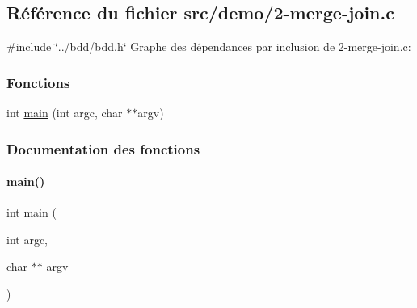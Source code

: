 \hypertarget{2-merge-join_8c}{}\subsection{Référence du fichier src/demo/2-\/merge-\/join.c}
\label{2-merge-join_8c}
{\ttfamily \#include \char`\"{}../bdd/bdd.\+h\char`\"{}}\newline
Graphe des dépendances par inclusion de 2-\/merge-\/join.c\+:
\subsubsection*{Fonctions}
\begin{DoxyCompactItemize}
\item 
int \hyperlink{2-merge-join_8c_a3c04138a5bfe5d72780bb7e82a18e627}{main} (int argc, char $\ast$$\ast$argv)
\end{DoxyCompactItemize}


\subsubsection{Documentation des fonctions}
\mbox{\label{2-merge-join_8c_a3c04138a5bfe5d72780bb7e82a18e627}} 
\paragraph{\texorpdfstring{main()}{main()}}
{\footnotesize\ttfamily int main (\begin{DoxyParamCaption}\item[{int}]{argc,  }\item[{char $\ast$$\ast$}]{argv }\end{DoxyParamCaption})}

